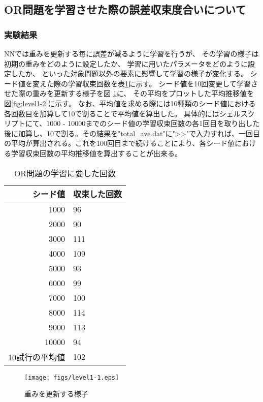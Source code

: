 \subsection{OR問題を学習させた際の誤差収束度合いについて}
\subsubsection{実験結果}
NNでは重みを更新する毎に誤差が減るように学習を行うが、
その学習の様子は初期の重みをどのように設定したか、
学習に用いたパラメータをどのように設定したか、
といった対象問題以外の要素に影響して学習の様子が変化する。
シード値を変えた際の学習収束回数を表\ref{table:level1}に示す。
シード値を10回変更して学習させた際の重みを更新する様子を図
\ref{fig:level1-1}に、
その平均をプロットした平均推移値を図\ref{fig:level1-2}に示す。
なお、平均値を求める際には10種類のシード値における各回数目を加算して10で割ることで平均値を算出した。
具体的にはシェルスクリプトにて、1000 - 10000までのシード値の学習収束回数の各1回目を取り出した後に加算し、10で割る。その結果を"total_ave.dat"に">>"で入力すれば、一回目の平均が算出される。これを100回目まで続けることにより、各シード値における学習収束回数の平均推移値を算出することが出来る。

\begin{table}[htb]
 \begin{center}
  \caption{OR問題の学習に要した回数}
  \label{table:level1}
  \begin{tabular}[htb]{r|l} \hline
   シード値 & 収束した回数 \\ \hline \hline
   1000 &  96\\ \hline
   2000 &  90\\ \hline
   3000 &  111\\ \hline
   4000 &  109\\ \hline
   5000 &  93\\ \hline
   6000 &  99\\ \hline
   7000 &  100\\ \hline
   8000 &  114\\ \hline
   9000 &  113\\ \hline
   10000 & 94 \\ \hline \hline
   10試行の平均値 & 102 \\ \hline
  \end{tabular}
 \end{center}
\end{table}


\begin{figure}[h]
 \begin{center}
  \texttt{[image: figs/level1-1.eps]}
  \caption{重みを更新する様子}
  \label{fig:level1-1}
 \end{center}
\end{figure}

